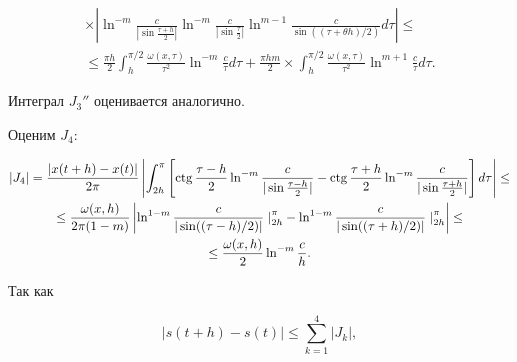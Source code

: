 \begin{multline}
%


\times \left| \ln^{-m}\frac{c}{|\sin \frac{\tau+h}{2}|}


\ln^{-m}\frac{c}{|\sin \frac{\tau}{2}|}


\ln^{m-1} \frac{c}{\sin((\tau+\theta h)/2)} d\tau \right| \leq \\


%


\leq \frac{ \pi h}{2} \int_h^{\pi/2} \frac{\omega(x,\tau)}{\tau^2}


\ln^{-m}\frac{c}{\tau} d\tau + \frac{\pi hm}{2} \times


\int_h^{\pi/2} \frac{\omega(x,\tau)}{\tau^2}


\ln^{m+1} \frac{c}{\tau} d\tau.


\end{multline}


Интеграл $J_3''$ оценивается аналогично.





Оценим $J_4$:


\begin{gather}


|J_4|=\frac{|x(t+h)-x(t)|}{2\pi} \left|\int_{2h}^{\pi}


\left[ \ctg \frac{\tau-h}{2}


\ln^{-m}\frac{c}{|\sin \frac{\tau-h}{2}|} - \ctg \frac{\tau+h}{2}


\ln^{-m}\frac{c}{|\sin \frac{\tau+h}{2}|} \right] d\tau \right|


\leq \notag \\


%


\leq \frac{\omega(x,h)}{2\pi(1-m)}


\left|\ln^{1-m} \frac{c}{|\sin ((\tau-h)/2)|} \left.\right|_{2h}^{\pi}-


\ln^{1-m} \frac{c}{|\sin ((\tau+h)/2)|}\left.\right|_{2h}^{\pi}


\right| \leq \notag \\


%


\leq \frac{\omega(x,h)}{2} \ln^{-m}\frac{c}{h}.


\end{gather}





Так как


\begin{equation}


|s(t+h)-s(t)| \leq \sum_{k=1}^4 |J_k|,


\end{equation}


